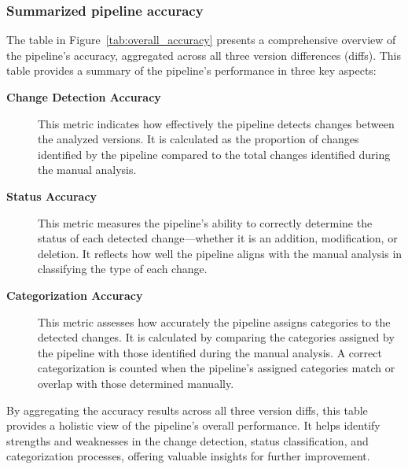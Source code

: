 \subsubsection{Summarized pipeline accuracy}
The table in Figure~\ref{tab:overall_accuracy} presents a comprehensive overview of the pipeline's accuracy, aggregated across all three version differences (diffs). This table provides a summary of the pipeline’s performance in three key aspects:

\begin{description}
    \item [\textbf{Change Detection Accuracy}] This metric indicates how effectively the pipeline detects changes between the analyzed versions. It is calculated as the proportion of changes identified by the pipeline compared to the total changes identified during the manual analysis.

    \item [\textbf{Status Accuracy}] This metric measures the pipeline's ability to correctly determine the status of each detected change—whether it is an addition, modification, or deletion. It reflects how well the pipeline aligns with the manual analysis in classifying the type of each change.

    \item [\textbf{Categorization Accuracy}] This metric assesses how accurately the pipeline assigns categories to the detected changes. It is calculated by comparing the categories assigned by the pipeline with those identified during the manual analysis. A correct categorization is counted when the pipeline's assigned categories match or overlap with those determined manually.

\end{description}

By aggregating the accuracy results across all three version diffs, this table provides a holistic view of the pipeline’s overall performance. It helps identify strengths and weaknesses in the change detection, status classification, and categorization processes, offering valuable insights for further improvement.

